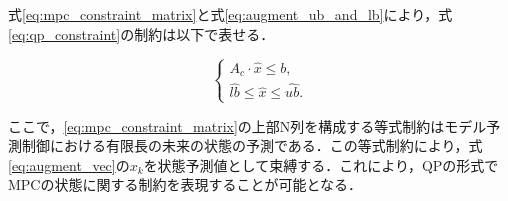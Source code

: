 式\eqref{eq:mpc_constraint_matrix}と式\eqref{eq:augment_ub_and_lb}により，式\eqref{eq:qp_constraint}の制約は以下で表せる．

\begin{equation}
  \begin{cases}
    A_{c} \cdot \hat{x} \leq b, \\
    \hat{lb} \leq \hat{x} \leq \hat{ub}.
  \end{cases}
  \label{eq:qp_augment_constraint}
\end{equation}





ここで，\eqref{eq:mpc_constraint_matrix}の上部N列を構成する等式制約はモデル予測制御における有限長の未来の状態の予測である．この等式制約により，式\eqref{eq:augment_vec}の$x_{k}$を状態予測値として束縛する．これにより，QPの形式でMPCの状態に関する制約を表現することが可能となる．

